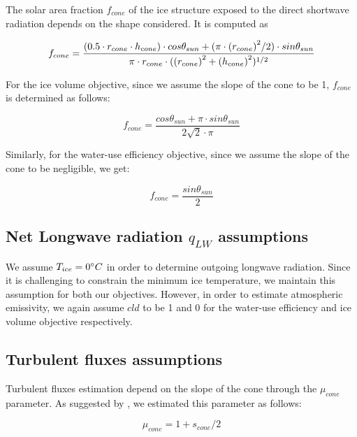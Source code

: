\documentclass[tc, manuscript]{copernicus}
\begin{document}
The solar area fraction $f_{cone}$ of the ice structure exposed to the direct shortwave radiation depends on the
shape considered. It is computed as

\begin{equation}
		f_{cone} =\frac{(0.5 \cdot r_{cone} \cdot h_{cone}) \cdot cos \theta_{sun} +(\pi \cdot
			{(r_{cone})}^2/2) \cdot sin \theta_{sun} }{\pi \cdot r_{cone} \cdot ({(r_{cone})}^2+{(h_{cone})}^2)^{1/2}}\\
\end{equation}

For the ice volume objective, since we assume the slope of the cone to be 1, $f_{cone}$ is determined as follows:

\begin{equation}
		f_{cone} =\frac{ cos \theta_{sun} + \pi \cdot sin \theta_{sun} }{2\sqrt{2} \cdot \pi }
\end{equation}

Similarly, for the water-use efficiency objective, since we assume the slope of the cone to be negligible, we get:

\begin{equation}
		f_{cone} =\frac{ sin \theta_{sun} }{2 }
\end{equation}

\subsection{Net Longwave radiation \texorpdfstring{$q_{LW}$}{Lg} assumptions} 

We assume $T_{ice} = 0 ^{\circ} C$ in order to determine outgoing longwave radiation. Since it is challenging to
constrain the minimum ice temperature, we maintain this assumption for both our objectives. However, in order to
estimate atmospheric emissivity, we again assume $cld$ to be 1 and 0 for the water-use efficiency and ice volume
objective respectively.

\subsection{Turbulent fluxes assumptions} \label{sec:Qs}

Turbulent fluxes estimation depend on the slope of the cone through the $\mu_{cone}$ parameter. As suggested 
by \citet{oerlemansBriefCommunicationGrowth2021}, we estimated this parameter as follows:

\begin{equation}
  \mu_{cone} =1 + s_{cone}/2
\end{equation}
\end{document}
